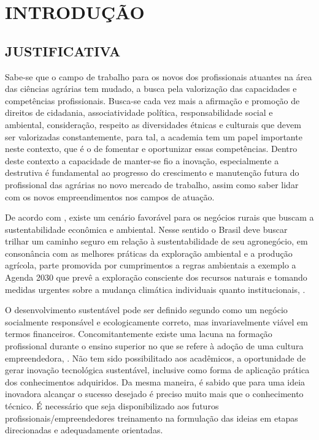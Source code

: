 \chapter{INTRODUÇÃO}

\section{JUSTIFICATIVA}

Sabe-se que o campo de trabalho para os novos dos profissionais atuantes na área das ciências agrárias tem mudado, a busca pela valorização das capacidades e competências profissionais. Busca-se cada vez mais a afirmação e promoção de direitos de cidadania, associatividade política, responsabilidade social e ambiental, consideração, respeito as diversidades étnicas e culturais que devem ser valorizadas constantemente, para tal, a academia  tem um papel importante neste contexto, que é  o de fomentar e oportunizar essas competências. Dentro deste contexto a capacidade de manter-se fio a inovação, especialmente a destrutiva é fundamental ao progresso do crescimento e manutenção futura do profissional das agrárias no novo mercado de trabalho, assim como saber lidar com os novos empreendimentos nos campos de atuação.


De acordo com , existe um cenário favorável para os negócios rurais que buscam a sustentabilidade econômica e ambiental. Nesse sentido o Brasil deve buscar trilhar  um caminho seguro em relação à sustentabilidade de seu agronegócio, em consonância com as melhores práticas da exploração ambiental e a produção agrícola, parte promovida por cumprimentos a regras ambientais a exemplo a Agenda 2030 que prevê a exploração consciente dos recursos naturais e tomando medidas urgentes sobre a mudança climática individuais quanto institucionais, \cite{filho_documentos_2017}.


O desenvolvimento sustentável pode ser definido segundo \cite{lara_ideologia_2017} como um negócio socialmente responsável e ecologicamente correto, mas invariavelmente viável em termos financeiros. Concomitantemente existe uma lacuna na formação profissional durante o ensino superior no que se refere à adoção de uma cultura empreendedora, \cite{lima_ser_2015}. Não tem sido possibilitado aos acadêmicos, a oportunidade de gerar inovação tecnológica sustentável, inclusive como forma de aplicação prática dos conhecimentos adquiridos. Da mesma maneira, é sabido que para uma ideia inovadora alcançar o sucesso desejado é preciso muito mais que o conhecimento técnico. É necessário que seja disponibilizado aos futuros profissionais/empreendedores treinamento na formulação das ideias em etapas direcionadas e adequadamente orientadas.


